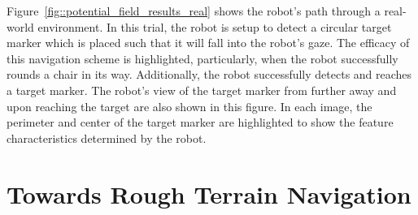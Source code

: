 			Figure~\ref{fig::potential_field_results_real} shows the robot's path through a real-world environment. In this trial, the robot is setup to detect a circular target marker which is placed such that it will fall into the robot's gaze. The efficacy of this navigation scheme is highlighted, particularly, when the robot successfully rounds a chair in its way. Additionally, the robot successfully detects and reaches a target marker. The robot's view of the target marker from further away and upon reaching the target are also shown in this figure. In each image, the perimeter and center of the target marker are highlighted to show the feature characteristics determined by the robot.






	\section{Towards Rough Terrain Navigation}

